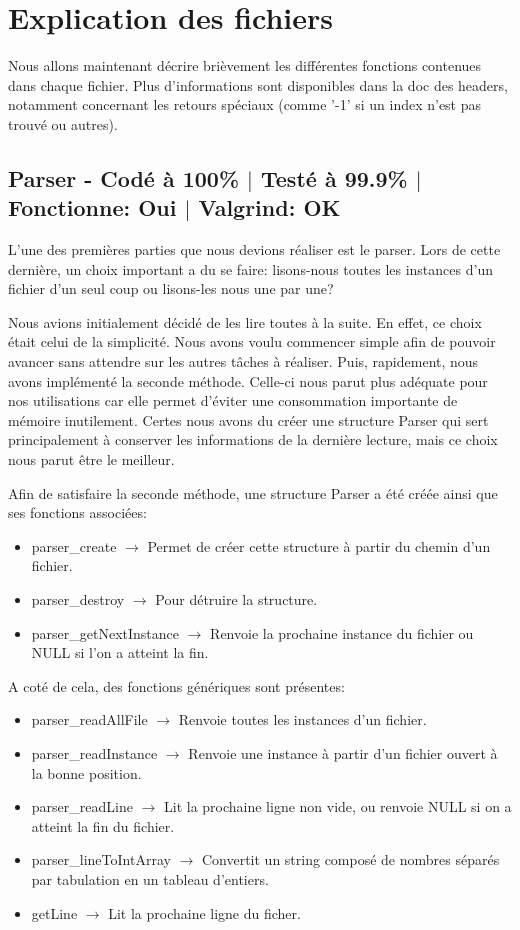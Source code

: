 \documentclass{EPUProjetPeiP}
\newcommand{\comp}[5]{
	\section[#1]{#1 {\small - Codé à #2\% $\vert$ Testé à #3\% $\vert$ Fonctionne: #4 $\vert$ Valgrind: #5}}
}
\begin{document}
\chapter{Explication des fichiers}
Nous allons maintenant décrire brièvement les différentes fonctions contenues dans chaque fichier. Plus d'informations sont disponibles dans la doc des headers, notamment concernant les retours spéciaux (comme '-1' si un index n'est pas trouvé ou autres).

\comp{Parser}{100}{99.9}{Oui}{OK}
L'une des premières parties que nous devions réaliser est le parser. Lors de cette dernière, un choix important a du se faire: lisons-nous toutes les instances d'un fichier d'un seul coup ou lisons-les nous une par une?

Nous avions initialement décidé de les lire toutes à la suite. En effet, ce choix était celui de la simplicité. Nous avons voulu commencer simple afin de pouvoir avancer sans attendre sur les autres tâches à réaliser. Puis, rapidement, nous avons implémenté la seconde méthode. Celle-ci nous parut plus adéquate pour nos utilisations car elle permet d'éviter une consommation importante de mémoire inutilement. Certes nous avons du créer une structure Parser qui sert principalement à conserver les informations de la dernière lecture, mais ce choix nous parut être le meilleur.

Afin de satisfaire la seconde méthode, une structure Parser a été créée ainsi que ses fonctions associées:
\begin{itemize}
	\item parser\_create $\longrightarrow$ Permet de créer cette structure à partir du chemin d'un fichier.
	\item parser\_destroy $\longrightarrow$ Pour détruire la structure.
	\item parser\_getNextInstance $\longrightarrow$ Renvoie la prochaine instance du fichier ou NULL si l'on a atteint la fin.\\
\end{itemize}

A coté de cela, des fonctions génériques sont présentes:
\begin{itemize}
	\item parser\_readAllFile $\longrightarrow$ Renvoie toutes les instances d'un fichier.
	\item parser\_readInstance $\longrightarrow$ Renvoie une instance à partir d'un fichier ouvert à la bonne position. 
	\item parser\_readLine $\longrightarrow$ Lit la prochaine ligne non vide, ou renvoie NULL si on a atteint la fin du fichier.
	\item parser\_lineToIntArray $\longrightarrow$ Convertit un string composé de nombres séparés par tabulation en un tableau d'entiers.
	\item getLine $\longrightarrow$ Lit la prochaine ligne du ficher.
\end{itemize}
\end{document}
